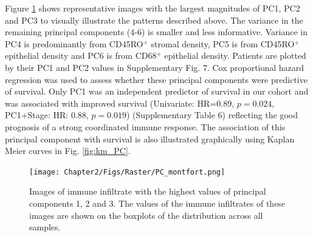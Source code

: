 Figure \ref{fig:PC_examples} shows representative images with the largest magnitudes of PC1, PC2 and PC3 to visually illustrate the patterns described above. The variance in the remaining principal components (4-6) is smaller and less informative. Variance in PC4 is predominantly from CD45RO$^+$ stromal density, PC5 is from CD45RO$^+$ epithelial density and PC6 is from CD68$^+$ epithelial density. Patients are plotted by their PC1 and PC2 values in Supplementary Fig. 7.  Cox proportional hazard regression was used to assess whether these principal components were predictive of survival. Only PC1 was an independent predictor of survival in our cohort and was associated with improved survival (Univariate: HR=$0.89$, $p=0.024$, PC1+Stage: HR: $0.88$, $p=0.019$) (Supplementary Table 6) reflecting the good prognosis of a strong coordinated immune response. The association of this principal component with survival is also illustrated graphically using Kaplan Meier curves in Fig. \ref{fig:km_PC}.
\begin{landscape}
\begin{figure}[width=0.8\textwidth, keepaspectratio]
    \centering
    \texttt{[image: Chapter2/Figs/Raster/PC\_montfort.png]}
    \caption[Examples of tissue with largest values of principal components.]{Images of immune infiltrate with the highest values of principal components 1, 2 and 3. The values of the immune infiltrates of these images are shown on the boxplots of the distribution across all samples.}
    \label{fig:PC_examples}
\end{figure}
\end{landscape}

